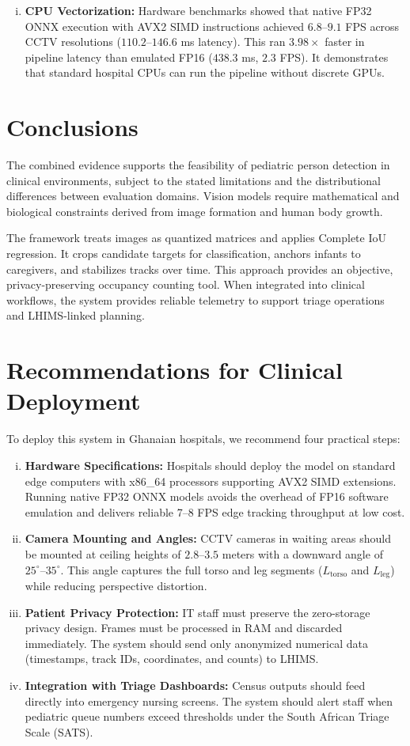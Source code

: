 \begin{enumerate}[(i)]
    \item \textbf{CPU Vectorization:} Hardware benchmarks showed that native FP32 ONNX execution with AVX2 SIMD instructions achieved $6.8\text{--}9.1$ FPS across CCTV resolutions ($110.2\text{--}146.6$ ms latency). This ran $3.98\times$ faster in pipeline latency than emulated FP16 ($438.3$ ms, $2.3$ FPS). It demonstrates that standard hospital CPUs can run the pipeline without discrete GPUs.
\end{enumerate}

\section{Conclusions}
The combined evidence supports the feasibility of pediatric person detection in clinical environments, subject to the stated limitations and the distributional differences between evaluation domains. Vision models require mathematical and biological constraints derived from image formation and human body growth.

The framework treats images as quantized matrices and applies Complete IoU regression. It crops candidate targets for classification, anchors infants to caregivers, and stabilizes tracks over time. This approach provides an objective, privacy-preserving occupancy counting tool. When integrated into clinical workflows, the system provides reliable telemetry to support triage operations and LHIMS-linked planning.

\section{Recommendations for Clinical Deployment}
To deploy this system in Ghanaian hospitals, we recommend four practical steps:
\begin{enumerate}[(i)]
    \item \textbf{Hardware Specifications:} Hospitals should deploy the model on standard edge computers with x86\_64 processors supporting AVX2 SIMD extensions. Running native FP32 ONNX models avoids the overhead of FP16 software emulation and delivers reliable 7--8 FPS edge tracking throughput at low cost.
    \item \textbf{Camera Mounting and Angles:} CCTV cameras in waiting areas should be mounted at ceiling heights of $2.8\text{--}3.5$ meters with a downward angle of $25^{\circ}\text{--}35^{\circ}$. This angle captures the full torso and leg segments ($L_{\text{torso}}$ and $L_{\text{leg}}$) while reducing perspective distortion.
    \item \textbf{Patient Privacy Protection:} IT staff must preserve the zero-storage privacy design. Frames must be processed in RAM and discarded immediately. The system should send only anonymized numerical data (timestamps, track IDs, coordinates, and counts) to LHIMS.
    \item \textbf{Integration with Triage Dashboards:} Census outputs should feed directly into emergency nursing screens. The system should alert staff when pediatric queue numbers exceed thresholds under the South African Triage Scale (SATS).
\end{enumerate}


